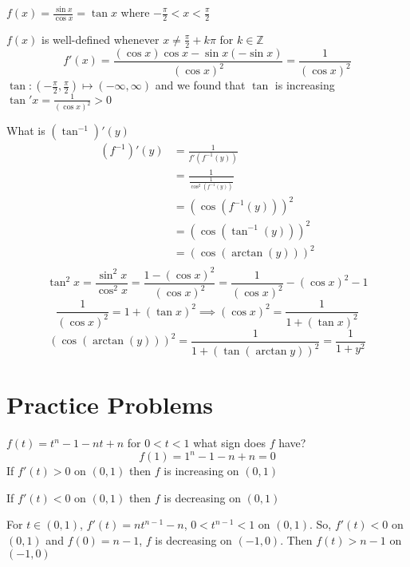\begin{example*}
  $f(x) = \frac{\sin x}{\cos x} = \tan x$ where $-\frac{\pi}{2} < x < \frac{\pi}{2}$

  $f(x)$ is well-defined whenever $x\neq \frac{\pi}{2} + k\pi$ for $k \in \mathbb{Z}$
  $$f'(x) = \frac{(\cos x)\cos x - \sin x (-\sin x)}{(\cos x)^2} = \frac{1}{(\cos x)^2}$$
  $\tan : \left(-\frac{\pi}{2}, \frac{\pi}{2}\right) \mapsto (-\infty, \infty)$ and we found that $\tan$ is increasing $\tan' x = \frac{1}{(\cos x)^ 2} > 0$

  What is $(\tan^{-1})'(y)$
  \begin{align*}
    (f^{-1})'(y) &= \frac{1}{f'(f^{-1}(y))} \\
    &= \frac{1}{\frac{1}{\cos^2(f^{-1}(y))}} \\
    &= (\cos(f^{-1}(y)))^2 \\
    &= (\cos(\tan^{-1}(y)))^2 \\
    &= (\cos(\arctan(y)))^2 \\
  \end{align*}
  $$\tan^2 x = \frac{\sin^2 x}{\cos^2 x} = \frac{1-(\cos x)^2}{(\cos x)^2} = \frac{1}{(\cos x)^2}-(\cos x)^2-1$$
  $$\frac{1}{(\cos x)^2} = 1 + (\tan x)^2 \implies (\cos x)^2 = \frac{1}{1 + (\tan x)^2}$$
  $$(\cos(\arctan(y)))^2 = \frac{1}{1 + (\tan(\arctan y))^2} = \frac{1}{1+y^2}$$
\end{example*}

\section{Practice Problems}

\begin{example*}[Q8]
  $f(t) = t^n - 1 - nt + n$ for $0 < t < 1$ what sign does $f$ have? 
  $$f(1) = 1^n - 1 - n + n = 0$$
  If $f'(t) > 0$ on $(0, 1)$ then $f$ is increasing on $(0, 1)$

  If $f'(t) < 0$ on $(0, 1)$ then $f$ is decreasing on $(0, 1)$

  For $t\in(0, 1)$, $f'(t) = nt^{n- 1} - n$, $0 < t^{n-1} < 1$ on $(0, 1)$. So, $f'(t) < 0$ on $(0, 1)$
  and $f(0) = n - 1$, $f$ is decreasing on $(-1, 0)$. Then $f(t) > n-1$ on $(-1, 0)$
\end{example*}


